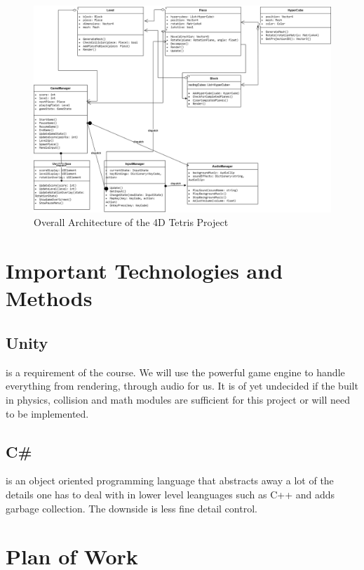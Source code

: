 \documentclass{article}
\begin{document}

\begin{figure}[H]
    \centering
    \includegraphics[width=\textwidth]{classes.png}
    \caption{Overall Architecture of the 4D Tetris Project}
    \label{fig:architecture}
\end{figure}

\section{Important Technologies and Methods}
\subsection{Unity} is a requirement of the course. We will use the powerful game engine to handle everything from rendering, through audio for us. It is of yet undecided if the built in physics, collision and math modules are sufficient for this project or will need to be implemented.
\subsection{C\#} is an object oriented programming language that abstracts away a lot of the details one has to deal with in lower level leanguages such as C++ and adds garbage collection. The downside is less fine detail control.


\section{Plan of Work}
\end{document}
